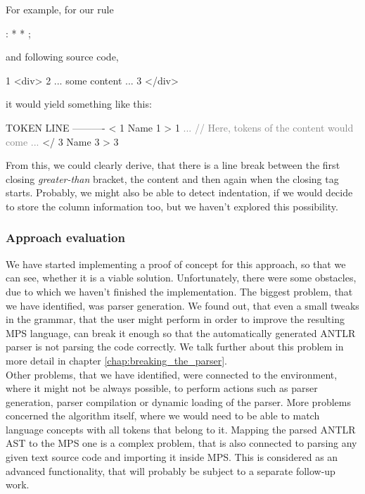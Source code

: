 \noindent
For example, for our  rule

\begin{antlr}
	  :   \literal{<}  * \literal{>} * \literal{</}  \literal{>} ;
\end{antlr}

\noindent
and following source code,

\begin{antlr}
	1   <div>
	2      ... some content ...
	3   </div>
\end{antlr}

\noindent
it would yield something like this:

\begin{antlr}
	TOKEN LINE
	----------
	<       1
	Name    1
	>       1
	\textcolor{gray}{...}
	\textcolor{gray}{// Here, tokens of the content would come}
	\textcolor{gray}{...}
	</      3
	Name    3
	>       3
\end{antlr}

From this, we could clearly derive, that there is a line break between the first closing \textit{greater-than} bracket, the content and then again when the closing tag starts.
Probably, we might also be able to detect indentation, if we would decide to store the column information too, but we haven't explored this possibility.

\subsubsection{Approach evaluation}

We have started implementing a proof of concept for this approach, so that we can see, whether it is a viable solution.
Unfortunately, there were some obstacles, due to which we haven't finished the implementation.
The biggest problem, that we have identified, was parser generation.
We found out, that even a small tweaks in the grammar, that the user might perform in order to improve the resulting MPS language, can break it enough so that the automatically generated ANTLR parser is not parsing the code correctly.
We talk further about this problem in more detail in chapter \ref{chap:breaking_the_parser}.
\\

Other problems, that we have identified, were connected to the environment, where it might not be always possible, to perform actions such as parser generation, parser compilation or dynamic loading of the parser.
More problems concerned the algorithm itself, where we would need to be able to match language concepts with all tokens that belong to it.
Mapping the parsed ANTLR AST to the MPS one is a complex problem, that is also connected to parsing any given text source code and importing it inside MPS.
This is considered as an advanced functionality, that will probably be subject to a separate follow-up work.
\\

